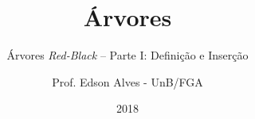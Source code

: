 \title{Árvores}
\subtitle{Árvores \textit{Red-Black} -- Parte I: Definição e Inserção}
\author{Prof. Edson Alves - UnB/FGA}
\date{2018}
